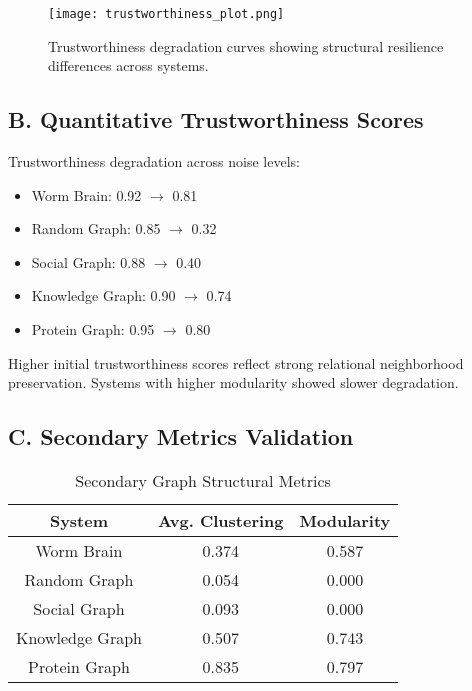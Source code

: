 \documentclass[conference]{IEEEtran}
\begin{document}
\begin{figure*}[!htb]
\centering
\texttt{[image: trustworthiness\_plot.png]}
\caption{Trustworthiness degradation curves showing structural resilience differences across systems.}
\label{fig:trust}
\end{figure*}

\subsection*{\textbf{B. Quantitative Trustworthiness Scores}}
Trustworthiness degradation across noise levels:

\begin{itemize}
    \item Worm Brain: 0.92 $\rightarrow$ 0.81
    \item Random Graph: 0.85 $\rightarrow$ 0.32
    \item Social Graph: 0.88 $\rightarrow$ 0.40
    \item Knowledge Graph: 0.90 $\rightarrow$ 0.74
    \item Protein Graph: 0.95 $\rightarrow$ 0.80
\end{itemize}

Higher initial trustworthiness scores reflect strong relational neighborhood preservation. Systems with higher modularity showed slower degradation.

\subsection*{\textbf{C. Secondary Metrics Validation}}
\begin{table}[htbp]
\caption{Secondary Graph Structural Metrics}
\begin{center}
\begin{tabular}{|c|c|c|}
\hline
\textbf{System} & \textbf{Avg. Clustering} & \textbf{Modularity} \\
\hline
Worm Brain & 0.374 & 0.587 \\
Random Graph & 0.054 & 0.000 \\
Social Graph & 0.093 & 0.000 \\
Knowledge Graph & 0.507 & 0.743 \\
Protein Graph & 0.835 & 0.797 \\
\hline
\end{tabular}
\label{tab:secondary}
\end{center}
\end{table}
\end{document}
